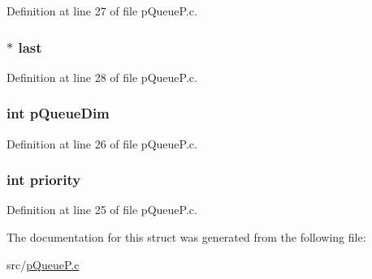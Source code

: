 Definition at line 27 of file pQueueP.c.

\hypertarget{structlist_with_prio_a1b88fdeb724166cbdf6717d7ba4b49c6}{
\subsubsection[{last}]{$\ast$ {\bf last}}}
\label{structlist_with_prio_a1b88fdeb724166cbdf6717d7ba4b49c6}


Definition at line 28 of file pQueueP.c.

\hypertarget{structlist_with_prio_a671979afa869339d57da6ad30c0498d8}{
\subsubsection[{pQueueDim}]{\setlength{\rightskip}{0pt plus 5cm}int {\bf pQueueDim}}}
\label{structlist_with_prio_a671979afa869339d57da6ad30c0498d8}


Definition at line 26 of file pQueueP.c.

\hypertarget{structlist_with_prio_acec9ce2df15222151ad66fcb1d74eb9f}{
\subsubsection[{priority}]{\setlength{\rightskip}{0pt plus 5cm}int {\bf priority}}}
\label{structlist_with_prio_acec9ce2df15222151ad66fcb1d74eb9f}


Definition at line 25 of file pQueueP.c.



The documentation for this struct was generated from the following file:\begin{DoxyCompactItemize}
\item 
src/\hyperlink{p_queue_p_8c}{pQueueP.c}\end{DoxyCompactItemize}
